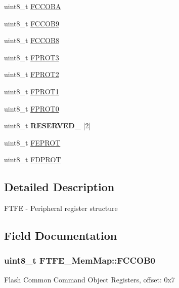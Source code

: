 \begin{DoxyCompactItemize}
\item 
uint8\+\_\+t \hyperlink{struct_f_t_f_e___mem_map_ab5fa4c4c247ee0b9798e7cfc904a2d8b}{F\+C\+C\+O\+B\+A}
\item 
uint8\+\_\+t \hyperlink{struct_f_t_f_e___mem_map_abd479b210960b55ac943bdc01be221c1}{F\+C\+C\+O\+B9}
\item 
uint8\+\_\+t \hyperlink{struct_f_t_f_e___mem_map_a7d553598d8cffb93c687bce40e59a0ef}{F\+C\+C\+O\+B8}
\item 
uint8\+\_\+t \hyperlink{struct_f_t_f_e___mem_map_a660f8b71409e54e6e4657b53e6b9fd3c}{F\+P\+R\+O\+T3}
\item 
uint8\+\_\+t \hyperlink{struct_f_t_f_e___mem_map_ab8fe958d37448e8b4d06b1db8e3b5222}{F\+P\+R\+O\+T2}
\item 
uint8\+\_\+t \hyperlink{struct_f_t_f_e___mem_map_a5a6edd9cc85f5b822067daf101cb67b3}{F\+P\+R\+O\+T1}
\item 
uint8\+\_\+t \hyperlink{struct_f_t_f_e___mem_map_ad874550db74efbacd41af6fecb4f3f76}{F\+P\+R\+O\+T0}
\item 
\hypertarget{struct_f_t_f_e___mem_map_ae15bafb34c663935cc213c9b29afb8a1}{}uint8\+\_\+t {\bfseries R\+E\+S\+E\+R\+V\+E\+D\+\_} \mbox{[}2\mbox{]}\label{struct_f_t_f_e___mem_map_ae15bafb34c663935cc213c9b29afb8a1}

\item 
uint8\+\_\+t \hyperlink{struct_f_t_f_e___mem_map_ad2c7b03da2909050081c4e293bedcbab}{F\+E\+P\+R\+O\+T}
\item 
uint8\+\_\+t \hyperlink{struct_f_t_f_e___mem_map_aab8bdf05ca369ec198ec06cc6c08c54e}{F\+D\+P\+R\+O\+T}
\end{DoxyCompactItemize}


\subsection{Detailed Description}
F\+T\+F\+E -\/ Peripheral register structure 

\subsection{Field Documentation}
\hypertarget{struct_f_t_f_e___mem_map_abea6e1649d554a8c0da79bdd0d59c42a}{}
\subsubsection[{F\+C\+C\+O\+B0}]{\setlength{\rightskip}{0pt plus 5cm}uint8\+\_\+t F\+T\+F\+E\+\_\+\+Mem\+Map\+::\+F\+C\+C\+O\+B0}\label{struct_f_t_f_e___mem_map_abea6e1649d554a8c0da79bdd0d59c42a}
Flash Common Command Object Registers, offset\+: 0x7 \hypertarget{struct_f_t_f_e___mem_map_ab72be9c808d3ff0a1e61da8c56f59289}{}
